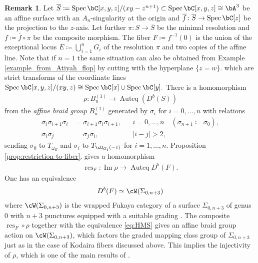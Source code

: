 \documentclass[12pt]{amsart}
\numberwithin{equation}{section}
\theoremstyle{plain}
\theoremstyle{definition}
\newtheorem{remark}[theorem]{Remark}
\DeclareMathOperator{\Auteq}{\mathrm{Auteq}}
\DeclareMathOperator{\Image}{\mathrm{Im}}
\DeclareMathOperator{\Spec}{\mathrm{Spec}}
\DeclareMathOperator{\res}{\mathrm{res}}
\begin{document}
\begin{remark}
    Let
    $
        \overline{S} \coloneqq \Spec \bC[x,y,z]/(x y - z^{n+1})
        \subset \Spec \bC[x,y,z] \cong \bA^3
    $
    be an affine surface with an $A_n$-singularity at the origin
    and
    $
        \overline{f} \colon \overline{S} \to \Spec \bC[z]
    $
    be the projection to the $z$-axis.
    Let further
    $
        \pi \colon S \to \overline{S}
    $
    be the minimal resolution
    and
    $
        f \coloneqq \overline{f} \circ \pi
    $
    be the composite morphism.
    The fiber
    $
        F
        \coloneqq f^{-1}(0)
    $
    is the union
    of the exceptional locus
    $
        E \coloneqq \bigcup_{i=1}^n G_i
    $
    of the resolution $\pi$
    and two copies of the affine line.
    Note that if $n=1$ the same situation can also be obtained from Example \ref{example_from_Atiyah_flop} by cutting with the hyperplane $\{z=w\}$.
    which are strict transforms of the
    coordinate lines
    $
        \Spec \bC[x,y,z]/(xy, z)
        \cong \Spec \bC[x] \cup \Spec \bC[y].
    $
    There is a homomorphism
    \begin{align}
        \rho \colon B_n^{(1)} \to \Auteq(D^b(S))
    \end{align}
    from the \emph{affine braid group}
    $
        B_n^{(1)}
    $
    generated by $\sigma_i$ for $i=0,\ldots,n$
    with relations
    \begin{align}
        \sigma_i \sigma_{i+1} \sigma_i & = \sigma_{i+1} \sigma_i \sigma_{i+1}, &  & i = 0, \ldots, n \quad(\sigma_{n+1} \coloneqq \sigma_0), \\
        \sigma_i \sigma_j              & = \sigma_j \sigma_i,                  &  & |i-j|>2,
    \end{align}
    sending $\sigma_0$ to $T_{\omega_E}$
    and $\sigma_i$ to
    $
        T_{\cO_{G_i}(-1)}
    $
    for $i=1, \ldots, n$.
    Proposition \ref{prop:restriction-to-fiber}. gives
    a homomorphism
    \begin{align}
        \res_F \colon \Image \rho \to \Auteq D^b(F).
    \end{align}
    One has an equivalence
    \begin{align} \label{eq:HMS}
        D^b(F) \simeq \cW(\Sigma_{0,n+3})
    \end{align}
    where $\cW(\Sigma_{0,n+3})$
    is the wrapped Fukaya category of a surface $\Sigma_{0,n+3}$
    of genus 0 with $n+3$ punctures
    equipped with a suitable grading
    \cite{MR3735868, MR3830878}.
    The composite $\res_F \circ \rho$
    together with the equivalence \eqref{eq:HMS}
    gives an affine braid group action
    on $\cW(\Sigma_{0,n+3})$,
    which factors the graded mapping class group
    of $\Sigma_{0,n+3}$
    just as in the case of Kodaira fibers discussed above.
    This implies the injectivity of $\rho$,
    which is one of the main results of
    \cite{MR2629510}.
\end{remark}


\printbibliography
\end{document}
